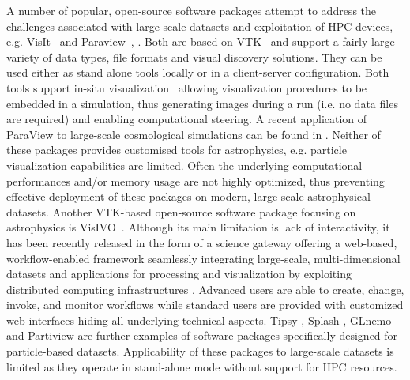 \documentclass[1p]{elsarticle}
\begin{document}
A number of popular, open-source software packages attempt to address the challenges associated with large-scale datasets and exploitation of HPC devices, e.g. VisIt~\cite{visit} and Paraview~\cite{paraview}, \cite{paraviewgrid}. Both are based on VTK~\cite{vtk} and support a fairly large variety of data types, file formats and visual discovery solutions. They can be used either as stand alone tools locally or in a client-server configuration. Both tools support in-situ visualization~\cite{in-situ} allowing visualization procedures to be embedded in a simulation, thus generating images during a run (i.e. no data files are required) and enabling computational steering. A recent application of ParaView to large-scale cosmological simulations can be found in \cite{2011ApJS..195...11W}. Neither of these packages provides customised tools for astrophysics,  e.g. particle visualization capabilities are limited. Often the underlying computational performances and/or memory usage are not highly optimized, thus preventing effective deployment of these packages on modern, large-scale astrophysical datasets. Another VTK-based open-source software package focusing on astrophysics is VisIVO~\cite{visivo}. Although its main limitation is lack of interactivity, it has been recently released in the form of a science gateway offering a web-based, workflow-enabled framework seamlessly integrating large-scale, multi-dimensional datasets and applications for processing and visualization by exploiting distributed computing infrastructures \cite{VisIVOGateway}. Advanced users are able to create, change, invoke, and monitor workflows while standard users are provided with customized web interfaces hiding all underlying technical aspects. Tipsy \cite{tipsyurl}, Splash \cite{splash}, GLnemo \cite{glnemo} and Partiview \cite{partiview} are further examples of software packages specifically designed for particle-based datasets. Applicability of these packages to large-scale datasets is limited as they operate in stand-alone mode without support for HPC resources.
\end{document}
